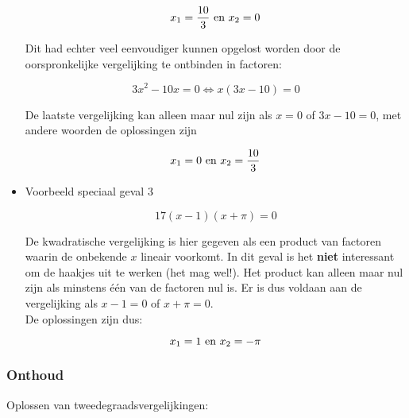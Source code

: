 \begin{itemize}
\[ x_{1}=\frac{10}{3} \textup{  en  } x_{2}=0 \]

Dit had echter veel eenvoudiger kunnen opgelost worden door de oorspronkelijke vergelijking te ontbinden in factoren:

\[3x^2-10x=0 \Leftrightarrow x(3x-10)=0  \]

De laatste vergelijking kan alleen maar nul zijn als $x=0$ of $3x-10=0$, met andere woorden de oplossingen zijn

\[ x_{1}=0 \textup{  en  } x_{2}=\frac{10}{3} \]

\item{Voorbeeld speciaal geval 3}

\[ 17(x-1)(x+\pi)=0 \]

De kwadratische vergelijking is hier gegeven als een product van factoren waarin de onbekende $x$ lineair voorkomt. In dit geval is het {\bf niet } interessant om de haakjes uit te werken (het mag wel!). Het product kan alleen maar nul zijn als minstens \'{e}\'{e}n van de factoren nul is. Er is dus voldaan aan de vergelijking als $x-1=0$ of $x+\pi=0$.\\
De oplossingen zijn dus:

\[ x_{1}=1 \textup{  en  } x_{2}=-\pi \]

\end{itemize}

\subsubsection{Onthoud}

Oplossen van tweedegraadsvergelijkingen:\\

